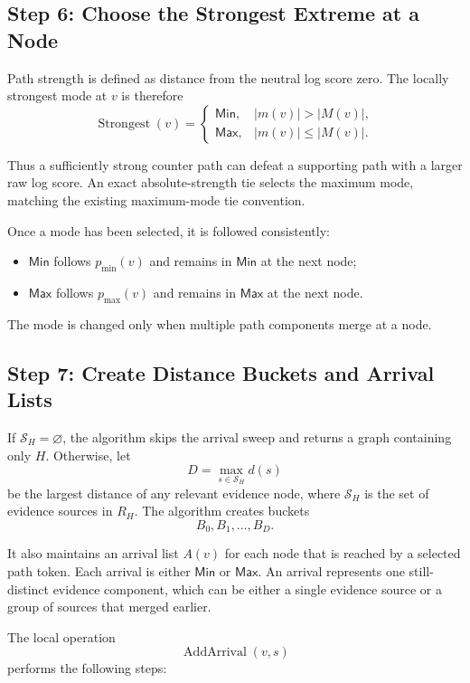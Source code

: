 \documentclass[11pt]{article}
\newcommand{\MinMode}{\mathsf{Min}}
\newcommand{\MaxMode}{\mathsf{Max}}
\newcommand{\Strongest}{\operatorname{Strongest}}
\begin{document}
\subsection{Step 6: Choose the Strongest Extreme at a Node}

Path strength is defined as distance from the neutral log score zero.  The
locally strongest mode at \(v\) is therefore
\[
    \Strongest(v)
      =
      \begin{cases}
        \MinMode, & |m(v)|>|M(v)|,\\
        \MaxMode, & |m(v)|\leq |M(v)|.
      \end{cases}
\]

Thus a sufficiently strong counter path can defeat a supporting path with a
larger raw log score.  An exact absolute-strength tie selects the maximum mode,
matching the existing maximum-mode tie convention.

Once a mode has been selected, it is followed consistently:

\begin{itemize}
    \item \(\MinMode\) follows \(p_{\min}(v)\) and remains in
          \(\MinMode\) at the next node;
    \item \(\MaxMode\) follows \(p_{\max}(v)\) and remains in
          \(\MaxMode\) at the next node.
\end{itemize}

The mode is changed only when multiple path components merge at a node.

\subsection{Step 7: Create Distance Buckets and Arrival Lists}

If \(\mathcal{S}_H=\varnothing\), the algorithm skips the arrival sweep and
returns a graph containing only \(H\).  Otherwise, let
\[
    D=\max_{s\in\mathcal{S}_H} d(s)
\]
be the largest distance of any relevant evidence node, where
\(\mathcal{S}_H\) is the set of evidence sources in \(R_H\).
The algorithm creates buckets
\[
    B_0,B_1,\ldots,B_D.
\]

It also maintains an arrival list \(A(v)\) for each node that is reached by a
selected path token.  Each arrival is either \(\MinMode\) or \(\MaxMode\).
An arrival represents one still-distinct evidence component, which can be
either a single evidence source or a group of sources that merged earlier.

The local operation
\[
    \operatorname{AddArrival}(v,s)
\]
performs the following steps:
\end{document}
